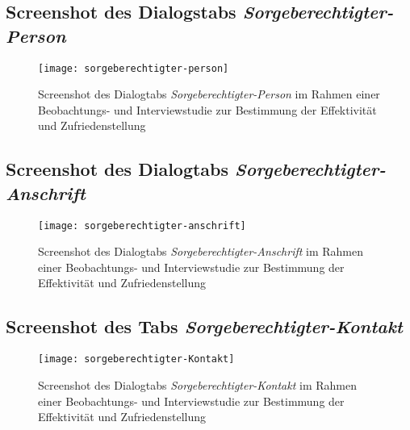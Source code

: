 \begin{landscape}
    \subsection{Screenshot des Dialogstabs \textit{Sorgeberechtigter-Person}}
    \label{section-sorgeberechtigter-person}
    \begin{figure}[H]
        \centering
        \caption{Screenshot des Dialogtabs \textit{Sorgeberechtigter-Person} im Rahmen einer Beobachtungs- und Interviewstudie zur Bestimmung der Effektivität und Zufriedenstellung}
        \begin{adjustbox}{width=0.5\linewidth, center}
            \texttt{[image: sorgeberechtigter-person]}
        \end{adjustbox}
    \end{figure}

    \subsection{Screenshot des Dialogtabs \textit{Sorgeberechtigter-Anschrift}}
    \label{section-sorgeberechtigter-anschrift}
    \begin{figure}[H]
        \centering
        \caption{Screenshot des Dialogtabs \textit{Sorgeberechtigter-Anschrift} im Rahmen einer Beobachtungs- und Interviewstudie zur Bestimmung der Effektivität und Zufriedenstellung}
        \begin{adjustbox}{width=0.85\linewidth, center}
            \texttt{[image: sorgeberechtigter-anschrift]}
        \end{adjustbox}
    \end{figure}

    \subsection{Screenshot des Tabs \textit{Sorgeberechtigter-Kontakt}}
    \label{section-sorgeberechtigter-kontakt}
    \begin{figure}[H]
        \centering
        \caption{Screenshot des Dialogtabs \textit{Sorgeberechtigter-Kontakt} im Rahmen einer Beobachtungs- und Interviewstudie zur Bestimmung der Effektivität und Zufriedenstellung}
        \begin{adjustbox}{width=0.6\linewidth, center}
            \texttt{[image: sorgeberechtigter-Kontakt]}
        \end{adjustbox}
    \end{figure}


\end{landscape}
